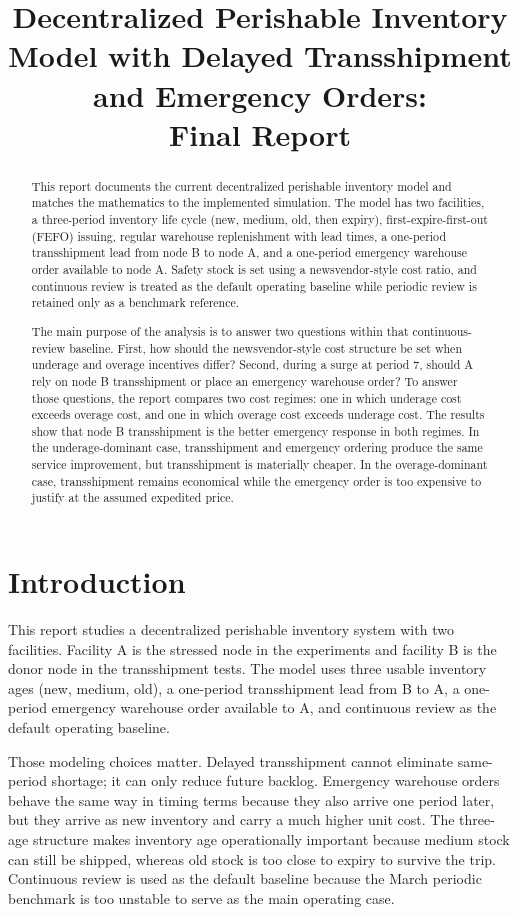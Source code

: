 \documentclass[11pt]{article}
\title{Decentralized Perishable Inventory Model with Delayed Transshipment and Emergency Orders:\\
Final Report}
\author{}
\date{}
\begin{document}
\maketitle

\begin{abstract}
This report documents the current decentralized perishable inventory model and matches the mathematics to the implemented simulation. The model has two facilities, a three-period inventory life cycle (new, medium, old, then expiry), first-expire-first-out (FEFO) issuing, regular warehouse replenishment with lead times, a one-period transshipment lead from node B to node A, and a one-period emergency warehouse order available to node A. Safety stock is set using a newsvendor-style cost ratio, and continuous review is treated as the default operating baseline while periodic review is retained only as a benchmark reference.

The main purpose of the analysis is to answer two questions within that continuous-review baseline. First, how should the newsvendor-style cost structure be set when underage and overage incentives differ? Second, during a surge at period 7, should A rely on node B transshipment or place an emergency warehouse order? To answer those questions, the report compares two cost regimes: one in which underage cost exceeds overage cost, and one in which overage cost exceeds underage cost. The results show that node B transshipment is the better emergency response in both regimes. In the underage-dominant case, transshipment and emergency ordering produce the same service improvement, but transshipment is materially cheaper. In the overage-dominant case, transshipment remains economical while the emergency order is too expensive to justify at the assumed expedited price.
\end{abstract}

\section{Introduction}
This report studies a decentralized perishable inventory system with two facilities. Facility A is the stressed node in the experiments and facility B is the donor node in the transshipment tests. The model uses three usable inventory ages (new, medium, old), a one-period transshipment lead from B to A, a one-period emergency warehouse order available to A, and continuous review as the default operating baseline.

Those modeling choices matter. Delayed transshipment cannot eliminate same-period shortage; it can only reduce future backlog. Emergency warehouse orders behave the same way in timing terms because they also arrive one period later, but they arrive as new inventory and carry a much higher unit cost. The three-age structure makes inventory age operationally important because medium stock can still be shipped, whereas old stock is too close to expiry to survive the trip. Continuous review is used as the default baseline because the March periodic benchmark is too unstable to serve as the main operating case.
\end{document}
